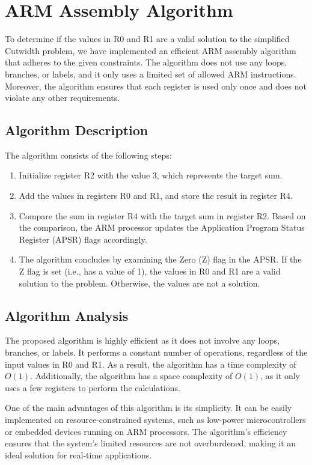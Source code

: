 \section{ARM Assembly Algorithm}

To determine if the values in R0 and R1 are a valid solution to the simplified Cutwidth problem, we have implemented an efficient ARM assembly algorithm that adheres to the given constraints. The algorithm does not use any loops, branches, or labels, and it only uses a limited set of allowed ARM instructions. Moreover, the algorithm ensures that each register is used only once and does not violate any other requirements.

\subsection{Algorithm Description}

The algorithm consists of the following steps:

\begin{enumerate}
  \item Initialize register R2 with the value 3, which represents the target sum.
  \item Add the values in registers R0 and R1, and store the result in register R4.
  \item Compare the sum in register R4 with the target sum in register R2. Based on the comparison, the ARM processor updates the Application Program Status Register (APSR) flags accordingly.
  \item The algorithm concludes by examining the Zero (Z) flag in the APSR. If the Z flag is set (i.e., has a value of 1), the values in R0 and R1 are a valid solution to the problem. Otherwise, the values are not a solution.
\end{enumerate}

\subsection{Algorithm Analysis}

The proposed algorithm is highly efficient as it does not involve any loops, branches, or labels. It performs a constant number of operations, regardless of the input values in R0 and R1. As a result, the algorithm has a time complexity of $O(1)$. Additionally, the algorithm has a space complexity of $O(1)$, as it only uses a few registers to perform the calculations.

One of the main advantages of this algorithm is its simplicity. It can be easily implemented on resource-constrained systems, such as low-power microcontrollers or embedded devices running on ARM processors. The algorithm's efficiency ensures that the system's limited resources are not overburdened, making it an ideal solution for real-time applications.

